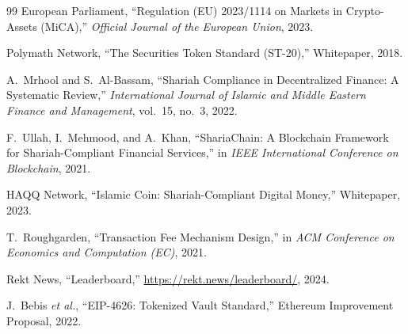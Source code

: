 \begin{thebibliography}{99}
 European Parliament, ``Regulation (EU) 2023/1114 on Markets in Crypto-Assets (MiCA),'' \emph{Official Journal of the European Union}, 2023.

 Polymath Network, ``The Securities Token Standard (ST-20),'' Whitepaper, 2018.

 A.~Mrhool and S.~Al-Bassam, ``Shariah Compliance in Decentralized Finance: A Systematic Review,'' \emph{International Journal of Islamic and Middle Eastern Finance and Management}, vol.~15, no.~3, 2022.

 F.~Ullah, I.~Mehmood, and A.~Khan, ``ShariaChain: A Blockchain Framework for Shariah-Compliant Financial Services,'' in \emph{IEEE International Conference on Blockchain}, 2021.

 HAQQ Network, ``Islamic Coin: Shariah-Compliant Digital Money,'' Whitepaper, 2023.

 T.~Roughgarden, ``Transaction Fee Mechanism Design,'' in \emph{ACM Conference on Economics and Computation (EC)}, 2021.

 Rekt News, ``Leaderboard,'' \url{https://rekt.news/leaderboard/}, 2024.

 J.~Bebis \emph{et al.}, ``EIP-4626: Tokenized Vault Standard,'' Ethereum Improvement Proposal, 2022.

\end{thebibliography}

